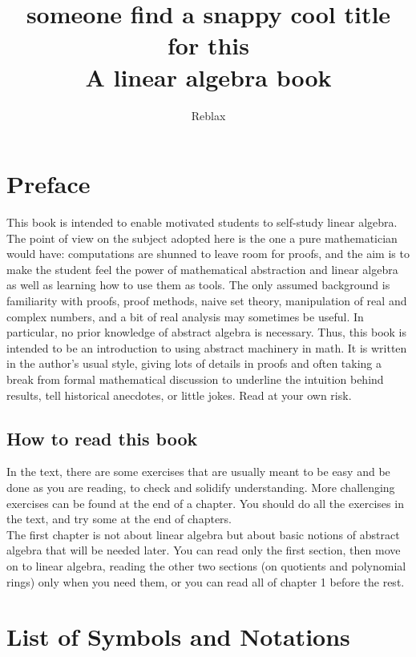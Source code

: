 \documentclass{book}
\title{someone find a snappy cool title for this \\ \small A linear algebra book}
\author{Reblax}
\date{}
\theoremstyle{plain}
\theoremstyle{definition}
\theoremstyle{remark}
\begin{document}
\maketitle

\tableofcontents

\chapter*{Preface}
This book is intended to enable motivated students to self-study linear algebra. The point of view on the subject adopted here is the one a pure mathematician would have: computations are shunned to leave room for proofs, and the aim is to make the student feel the power of mathematical abstraction and linear algebra as well as learning how to use them as tools. The only assumed background is familiarity with proofs, proof methods, naive set theory, manipulation of real and complex numbers, and a bit of real analysis may sometimes be useful. In particular, no prior knowledge of abstract algebra is necessary. Thus, this book is intended to be an introduction to using abstract machinery in math. It is written in the author's usual style, giving lots of details in proofs and often taking a break from formal mathematical discussion to underline the intuition behind results, tell historical anecdotes, or little jokes. Read at your own risk.

\section*{How to read this book}

In the text, there are some exercises that are usually meant to be easy and be done as you are reading, to check and solidify understanding. More challenging exercises can be found at the end of a chapter. You should do all the exercises in the text, and try some at the end of chapters. \\
The first chapter is not about linear algebra but about basic notions of abstract algebra that will be needed later. You can read only the first section, then move on to linear algebra, reading the other two sections (on quotients and polynomial rings) only when you need them, or you can read all of chapter 1 before the rest.

\chapter*{List of Symbols and Notations}
\end{document}
